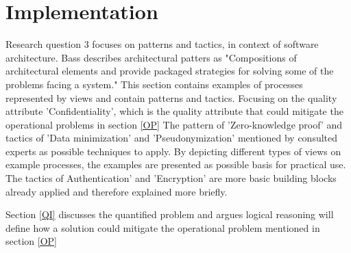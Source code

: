 \chapter{Implementation}\label{s:Implementation}
Research question 3 focuses on patterns and tactics, in context of software architecture. Bass \etal \cite{Bass2015SoftwareAI} describes architectural patters as "Compositions of architectural elements and provide packaged strategies for solving some of the problems facing a system." This section contains examples of processes represented by views and contain patterns and tactics. Focusing on the quality attribute 'Confidentiality', which is the quality attribute that could mitigate the operational problems in section \ref{OP} The pattern of 'Zero-knowledge proof' and tactics of 'Data minimization' and 'Pseudonymization' mentioned by consulted experts as possible techniques to apply. By depicting different types of views on example processes, the examples are presented as possible basis for practical use. The tactics of Authentication' and 'Encryption' are more basic building blocks already applied and therefore explained more briefly.

Section \ref{QI} discusses the quantified problem and argues logical reasoning will define how a solution could mitigate the operational problem mentioned in section \ref{OP}
